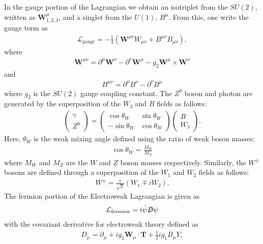 \noindent In the gauge portion of the Lagrangian we obtain an isotriplet from the $SU(2)$, written as $\textbf{W}^{\mu}_{1,2,3}$, and a singlet from the $U(1)$, $B^{\mu}$.
From this, one write the gauge term as
\begin{align}
\mathcal{L}_{\textrm{gauge}} = -\frac{1}{4}\left(\textbf{W}^{\mu \nu}W_{\mu \nu} + B^{\mu \nu}B_{\mu \nu} \right),
\end{align}
where
\begin{align}
\textbf{W}^{\mu \nu} = \partial^{\mu} \textbf{W}^{\nu} - \partial^{\nu} \textbf{W}^{\mu} - g_{2} \textbf{W}^{\mu} \times \textbf{W}^{\nu}
\end{align}
and
\begin{align}
B^{\mu \nu} = \partial^{\mu} B^{\nu} - \partial^{\nu} B^{\mu}
\end{align}
where $g_{2}$ is the $SU(2)$ gauge coupling constant.
The $Z^{0}$ boson and photon are generated by the superposition of the $W_{3}$ and $B$ fields as follows:
\begin{align}
\begin{pmatrix}
\gamma \\
Z^{0}
\end{pmatrix} = \begin{pmatrix} 
\cos\theta_{W} & \sin\theta_{W} \\
-\sin\theta_{W}& \cos\theta_{W} 
\end{pmatrix} \begin{pmatrix}
B \\
W_{3}
 \end{pmatrix}.
\end{align}
Here, $\theta_{W}$ is the weak mixing angle defined using the ratio of weak boson masses:
\begin{align} 
\cos\theta_{W} = \frac{M_{W}}{M_{Z}}
\end{align}
where $M_{W}$ and $M_{Z}$ are the $W$ and $Z$ boson masses respectively.
Similarly, the $W^{\pm}$ bosons are defined through a superposition of the $W_{1}$ and $W_{2}$ fields as follows:
\begin{align}
W^{\pm} = \frac{1}{\sqrt{2}} \left(W_{1} \mp iW_{2} \right).
\end{align}
The fermion portion of the Electroweak Lagrangian is given as
\begin{align}
\mathcal{L}_{\textrm{fermion}} = i \bar{\psi}\slashed{D}\psi
\end{align}
with the covariant derivative for electroweak theory defined as 
\begin{align}
D_{\mu} =  \partial_{\mu} + ig_{2}\textbf{W}_{\mu} \cdot \textbf{T} + \frac{1}{2} ig_{1} B_{\mu} Y,
\label{eqn:EWDerivative}
\end{align}

